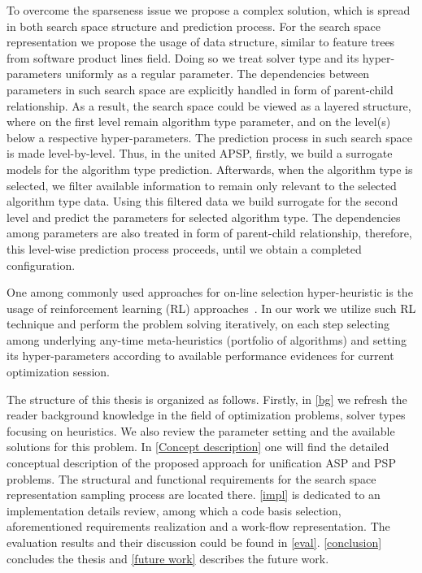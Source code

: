 To overcome the sparseness issue we propose a complex solution, which is spread in both search space structure and prediction process. For the search space representation we propose the usage of data structure, similar to feature trees from software product lines field. Doing so we treat solver type and its hyper-parameters uniformly as a regular parameter. The dependencies between parameters in such search space are explicitly handled in form of parent-child relationship. As a result, the search space could be viewed as a layered structure, where on the first level remain algorithm type parameter, and on the level(s) below a respective hyper-parameters. The prediction process in such search space is made level-by-level. Thus, in the united APSP, firstly, we build a surrogate models for the algorithm type prediction. Afterwards, when the algorithm type is selected, we filter available information to remain only relevant to the selected algorithm type data. Using this filtered data we build surrogate for the second level and predict the parameters for selected algorithm type. The dependencies among parameters are also treated in form of parent-child relationship, therefore, this level-wise prediction process proceeds, until we obtain a completed configuration.

One among commonly used approaches for on-line selection hyper-heuristic is the usage of reinforcement learning (RL) approaches~\cite{moriarty1999evolutionary,mcclymont2011markov}. In our work we utilize such RL technique and perform the problem solving iteratively, on each step selecting among underlying any-time meta-heuristics (portfolio of algorithms) and setting its hyper-parameters according to available performance evidences for current optimization session.

The structure of this thesis is organized as follows. Firstly, in \cref{bg} we refresh the reader background knowledge in the field of optimization problems, solver types focusing on heuristics. We also review the parameter setting and the available solutions for this problem. In \cref{Concept description} one will find the detailed conceptual description of the proposed approach for unification ASP and PSP problems. The structural and functional requirements for the search space representation sampling process are located there. \cref{impl} is dedicated to an implementation details review, among which a code basis selection, aforementioned requirements realization and a work-flow representation. The evaluation results and their discussion could be found in \cref{eval}. \cref{conclusion} concludes the thesis and \cref{future work} describes the future work.
